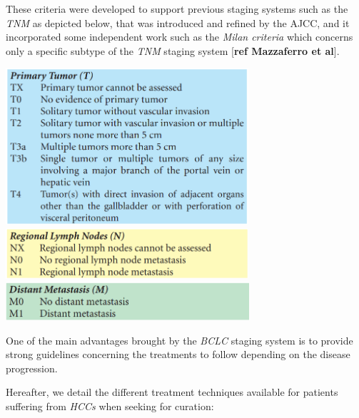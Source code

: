 \documentclass[]{article}
\begin{document}
These criteria were developed to support previous staging systems such
as the \emph{TNM} as depicted below, that was introduced and refined by
the AJCC, and it incorporated some independent work such as the
\emph{Milan criteria} which concerns only a specific subtype of the
\emph{TNM} staging system {[}\textbf{ref Mazzaferro et al}{]}.

\includegraphics[width=3.53968in,height=2.29099in]{./images/media/image1.png}\includegraphics[width=3.54596in,height=0.73629in]{./images/media/image8.png}\includegraphics[width=3.55297in,height=0.56068in]{./images/media/image12.png}

One of the main advantages brought by the \emph{BCLC} staging system is
to provide strong guidelines concerning the treatments to follow
depending on the disease progression.

Hereafter, we detail the different treatment techniques available for
patients suffering from \emph{HCCs} when seeking for curation:
\end{document}
